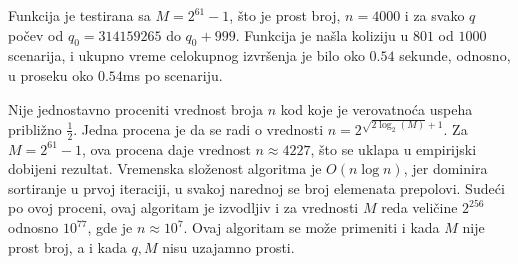 \noindent
\begin{minipage}[l]{\textwidth}

\end{minipage}

Funkcija je testirana sa $M = 2^{61}-1$, \v sto je prost broj, $n = 4000$ i za svako $q$ po\v cev od $q_0 = 314159265$ do $q_0+999$. Funkcija je na\v sla koliziju u $801$ od $1000$ scenarija, i ukupno vreme celokupnog izvr\v senja je bilo oko $0.54$ sekunde, odnosno, u proseku oko $0.54$ms po scenariju.

Nije jednostavno proceniti vrednost broja $n$ kod koje je verovatno\' ca uspeha pribli\v zno $\frac12$. Jedna procena\cite{cfantihash} je da se radi o vrednosti $n = 2^{\sqrt{2\log_2(M)}+1}$. Za $M = 2^{61}-1$, ova procena daje vrednost $n \approx 4227$, \v sto se uklapa u empirijski dobijeni rezultat. Vremenska slo\v zenost algoritma je $O(n \log n)$, jer dominira sortiranje u prvoj iteraciji, u svakoj narednoj se broj elemenata prepolovi. Sude\' ci po ovoj proceni, ovaj algoritam je izvodljiv i za vrednosti $M$ reda veli\v cine $2^{256}$ odnosno $10^{77}$, gde je $n \approx 10^7$. Ovaj algoritam se mo\v ze primeniti i kada $M$ nije prost broj, a i kada $q,M$ nisu uzajamno prosti.


